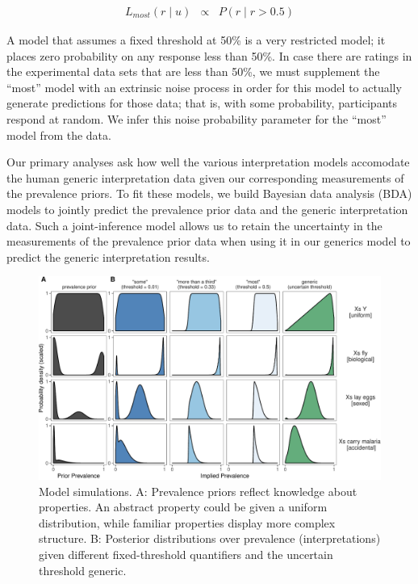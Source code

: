 \documentclass[,man,floatsintext]{apa6}
\theoremstyle{definition}
\theoremstyle{definition}
\theoremstyle{definition}
\theoremstyle{remark}
\begin{document}
\begin{eqnarray}
L_{most}(r \mid u) &\propto&  P(r \mid r > 0.5)  \label{eq:mostModel}
\end{eqnarray}

A model that assumes a fixed threshold at 50\% is a very restricted
model; it places zero probability on any response less than 50\%. In
case there are ratings in the experimental data sets that are less than
50\%, we must supplement the \enquote{most} model with an extrinsic
noise process in order for this model to actually generate predictions
for those data; that is, with some probability, participants respond at
random. We infer this noise probability parameter for the \enquote{most}
model from the data.

Our primary analyses ask how well the various interpretation models
accomodate the human generic interpretation data given our corresponding
measurements of the prevalence priors. To fit these models, we build
Bayesian data analysis (BDA) models to jointly predict the prevalence
prior data and the generic interpretation data. Such a joint-inference
model allows us to retain the uncertainty in the measurements of the
prevalence prior data when using it in our generics model to predict the
generic interpretation results.

\begin{figure}
\centering
\includegraphics{genint_files/figure-latex/modelSimulations-1.pdf}
\caption{\label{fig:modelSimulations}Model simulations. A: Prevalence priors
reflect knowledge about properties. An abstract property could be given
a uniform distribution, while familiar properties display more complex
structure. B: Posterior distributions over prevalence (interpretations)
given different fixed-threshold quantifiers and the uncertain threshold
generic.}
\end{figure}
\end{document}
